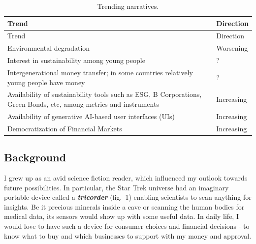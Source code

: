 \documentclass[
  letterpaper,
  DIV=11,
  numbers=noendperiod]{scrartcl}
\begin{document}
\begin{longtable}[]{@{}
  >{\raggedright\arraybackslash}p{}
  >{\raggedright\arraybackslash}p{}@{}}
\caption{Trending narratives.}\tabularnewline
\toprule\noalign{}
\begin{minipage}[b]{\linewidth}\raggedright
Trend
\end{minipage} & \begin{minipage}[b]{\linewidth}\raggedright
Direction
\end{minipage} \\
\midrule\noalign{}
\endfirsthead
\toprule\noalign{}
\begin{minipage}[b]{\linewidth}\raggedright
Trend
\end{minipage} & \begin{minipage}[b]{\linewidth}\raggedright
Direction
\end{minipage} \\
\midrule\noalign{}
\endhead
\bottomrule\noalign{}
\endlastfoot
Environmental degradation & Worsening \\
Interest in sustainability among young people & ? \\
Intergenerational money transfer; in some countries relatively young
people have money & ? \\
Availability of sustainability tools such as ESG, B Corporations, Green
Bonds, etc, among metrics and instruments & Increasing \\
Availability of generative AI-based user interfaces (UIs) &
Increasing \\
Democratization of Financial Markets & Increasing \\
\end{longtable}

\subsection{Background}\label{background}

I grew up as an avid science fiction reader, which influenced my outlook
towards future possibilities. In particular, the Star Trek universe had
an imaginary portable device called a \textbf{\emph{tricorder}} (fig.~1)
enabling scientists to scan anything for insights. Be it precious
minerals inside a cave or scanning the human bodies for medical data,
its sensors would show up with some useful data. In daily life, I would
love to have such a device for consumer choices and financial decisions
- to know what to buy and which businesses to support with my money and
approval.
\end{document}
